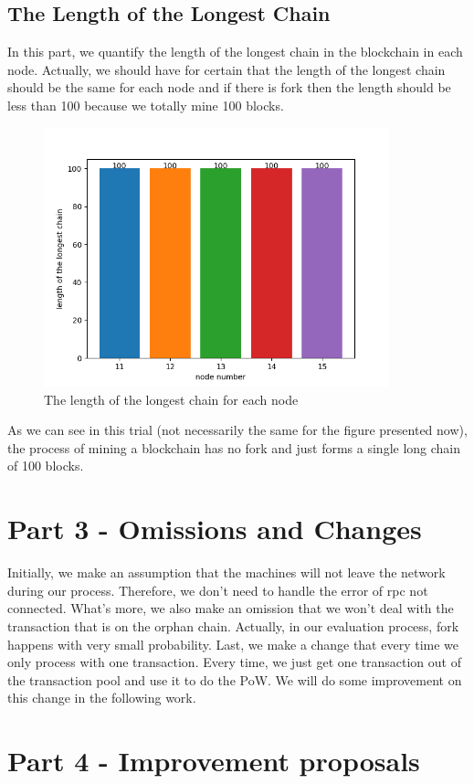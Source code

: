\documentclass{article}
\begin{document}
    \subsection{The Length of the Longest Chain}
    In this part, we quantify the length of the longest chain in the blockchain in each node. Actually, we should have for certain that the length of the longest chain should be the same for each node and if there is fork then the length should be less than 100 because we totally mine 100 blocks.
    \begin{figure}[H]
        \centering
        \includegraphics[width=10cm]{./eval/long.png}
        \caption{The length of the longest chain for each node}
        \label{fig:my_label}
    \end{figure}
    As we can see in this trial (not necessarily the same for the figure presented now), the process of mining a blockchain has no fork and just forms a single long chain of 100 blocks.
    \section{Part 3 - Omissions and Changes}\label{sec:part-2---omissions&changes}
    Initially, we make an assumption that the machines will not leave the network during our process. Therefore, we don't need to handle the error of rpc not connected. What's more, we also make an omission that we won't deal with the transaction that is on the orphan chain. Actually, in our evaluation process, fork happens with very small probability. Last, we make a change that every time we only process with one transaction. Every time, we just get one transaction out of the transaction pool and use it to do the PoW. We will do some improvement on this change in the following work.
    
    \section{Part 4 - Improvement proposals}
\end{document}
